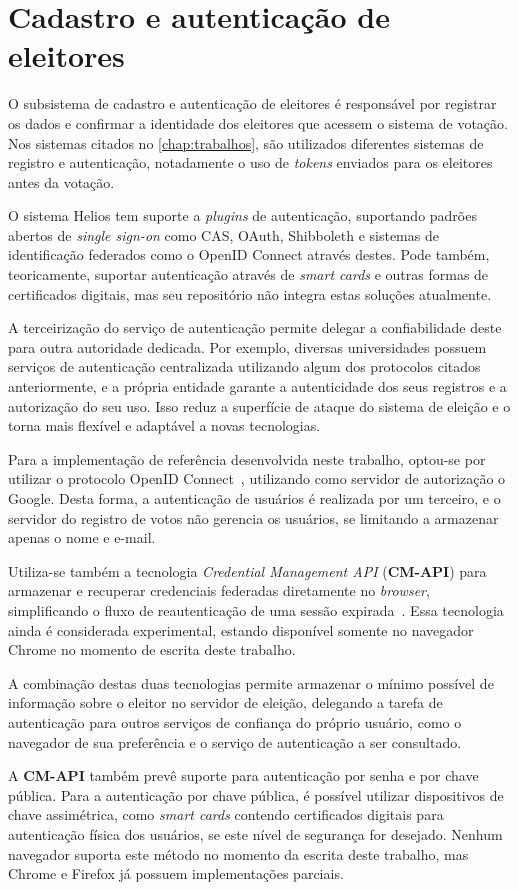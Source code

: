 \section{Cadastro e autenticação de eleitores}

O subsistema de cadastro e autenticação de eleitores é responsável por
registrar os dados e confirmar a identidade dos eleitores que acessem o sistema
de votação. Nos sistemas citados no \autoref{chap:trabalhos}, são utilizados
diferentes sistemas de registro e autenticação, notadamente o uso de
\textit{tokens} enviados para os eleitores antes da votação.

O sistema Helios tem suporte a \textit{plugins} de autenticação, suportando
padrões abertos de \textit{single sign-on} como CAS, OAuth, Shibboleth e
sistemas de identificação federados como o OpenID Connect através destes. Pode
também, teoricamente, suportar autenticação através de \textit{smart cards} e
outras formas de certificados digitais, mas seu repositório não integra estas
soluções atualmente.

A terceirização do serviço de autenticação permite delegar a confiabilidade
deste para outra autoridade dedicada. Por exemplo, diversas universidades
possuem serviços de autenticação centralizada utilizando algum dos protocolos
citados anteriormente, e a própria entidade garante a autenticidade dos seus
registros e a autorização do seu uso. Isso reduz a superfície de ataque do
sistema de eleição e o torna mais flexível e adaptável a novas tecnologias.

Para a implementação de referência desenvolvida neste trabalho, optou-se por
utilizar o protocolo OpenID Connect~\cite{sakimura2014openid}, utilizando como
servidor de autorização o Google. Desta forma, a autenticação de usuários é
realizada por um terceiro, e o servidor do registro de votos não gerencia os
usuários, se limitando a armazenar apenas o nome e e-mail.

Utiliza-se também a tecnologia \textit{Credential Management API}
(\textbf{CM-API}) para armazenar e recuperar credenciais federadas diretamente
no \textit{browser}, simplificando o fluxo de reautenticação de uma sessão
expirada~\cite{Credenti82:online}. Essa tecnologia ainda é considerada
experimental, estando disponível somente no navegador Chrome no momento de
escrita deste trabalho.

A combinação destas duas tecnologias permite armazenar o mínimo possível de
informação sobre o eleitor no servidor de eleição, delegando a tarefa de
autenticação para outros serviços de confiança do próprio usuário, como o
navegador de sua preferência e o serviço de autenticação a ser consultado.

A \textbf{CM-API} também prevê suporte para autenticação por senha e por chave
pública. Para a autenticação por chave pública, é possível utilizar
dispositivos de chave assimétrica, como \textit{smart cards} contendo
certificados digitais para autenticação física dos usuários, se este nível de
segurança for desejado. Nenhum navegador suporta este método no momento da
escrita deste trabalho, mas Chrome e Firefox já possuem implementações
parciais.
